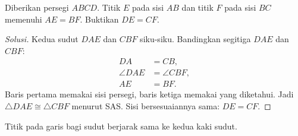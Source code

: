 \documentclass[12pt]{scrartcl}
\begin{document}
\begin{example}
Diberikan persegi $ABCD$. Titik $E$ pada sisi $AB$ dan titik $F$ pada sisi
$BC$ memenuhi $AE = BF$. Buktikan $DE = CF$.
\begin{center}
\end{center}
\end{example}
\begin{proof}[Solusi]
Kedua sudut $DAE$ dan $CBF$ siku-siku. Bandingkan segitiga $DAE$ dan
$CBF$:
\begin{align*}
DA &= CB, \\
\angle DAE &= \angle CBF, \\
AE &= BF.
\end{align*}
Baris pertama memakai sisi persegi, baris ketiga memakai yang diketahui.
Jadi $\triangle DAE \cong \triangle CBF$ menurut SAS. Sisi
bersesuaiannya sama: $DE = CF$.
\end{proof}

\begin{fact}
Titik pada garis bagi sudut berjarak sama ke kedua kaki sudut.
\end{fact}
\end{document}
